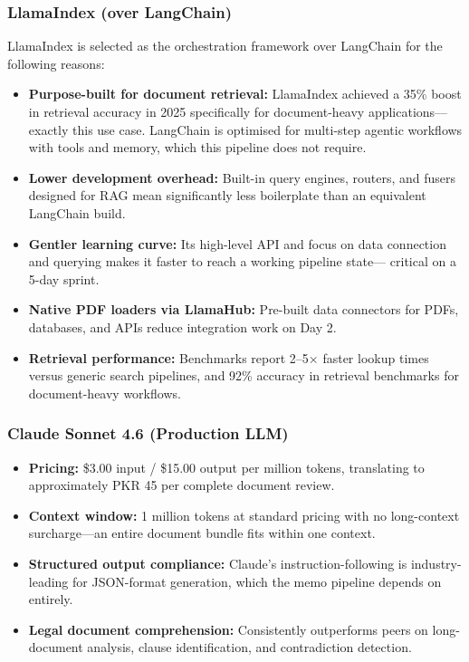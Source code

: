 \documentclass[12pt, a4paper]{article}
\begin{document}
\subsubsection{LlamaIndex (over LangChain)}

LlamaIndex is selected as the orchestration framework over LangChain for the
following reasons:

\begin{itemize}[leftmargin=1.5cm]
    \item \textbf{Purpose-built for document retrieval:} LlamaIndex achieved a
    35\% boost in retrieval accuracy in 2025 specifically for document-heavy
    applications---exactly this use case. LangChain is optimised for multi-step
    agentic workflows with tools and memory, which this pipeline does not require.
    \item \textbf{Lower development overhead:} Built-in query engines, routers,
    and fusers designed for RAG mean significantly less boilerplate than an
    equivalent LangChain build.
    \item \textbf{Gentler learning curve:} Its high-level API and focus on data
    connection and querying makes it faster to reach a working pipeline state---
    critical on a 5-day sprint.
    \item \textbf{Native PDF loaders via LlamaHub:} Pre-built data connectors for
    PDFs, databases, and APIs reduce integration work on Day 2.
    \item \textbf{Retrieval performance:} Benchmarks report 2--5$\times$ faster
    lookup times versus generic search pipelines, and 92\% accuracy in retrieval
    benchmarks for document-heavy workflows.
\end{itemize}

\subsubsection{Claude Sonnet 4.6 (Production LLM)}

\begin{itemize}[leftmargin=1.5cm]
    \item \textbf{Pricing:} \$3.00 input / \$15.00 output per million tokens,
    translating to approximately PKR 45 per complete document review.
    \item \textbf{Context window:} 1 million tokens at standard pricing with no
    long-context surcharge---an entire document bundle fits within one context.
    \item \textbf{Structured output compliance:} Claude's instruction-following
    is industry-leading for JSON-format generation, which the memo pipeline
    depends on entirely.
    \item \textbf{Legal document comprehension:} Consistently outperforms peers
    on long-document analysis, clause identification, and contradiction detection.
\end{itemize}
\end{document}

